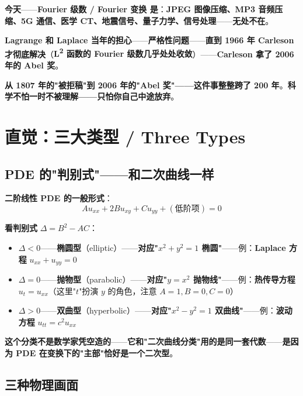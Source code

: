 \begin{tcolorbox}[storybox={\Large 小故事：Fourier 与三次被拒的论文}]
\medskip

\textbf{今天}——\textbf{Fourier 级数 / Fourier 变换 是}：\textbf{JPEG 图像压缩、MP3 音频压缩、5G 通信、医学 CT、地震信号、量子力学、信号处理}——\textbf{无处不在}。

\medskip

\textbf{Lagrange 和 Laplace 当年的担心}——\textbf{严格性问题}——\textbf{直到 1966 年 Carleson 才彻底解决}（\textbf{L\textsuperscript{2} 函数的 Fourier 级数几乎处处收敛}）——\textbf{Carleson 拿了 2006 年的 Abel 奖}。

\medskip

\textbf{从 1807 年的"被拒稿"到 2006 年的"Abel 奖"——这件事整整跨了 200 年}。\textbf{科学不怕一时不被理解——只怕你自己中途放弃}。
\end{tcolorbox}

\section{直觉：三大类型 / Three Types}

\subsection{PDE 的"判别式"——和二次曲线一样}

\textbf{二阶线性 PDE 的一般形式}：
\begin{equation}
A u_{xx} + 2B u_{xy} + C u_{yy} + (\text{低阶项}) = 0
\end{equation}

\textbf{看判别式} $\Delta = B^2 - AC$：

\begin{itemize}
\item $\Delta < 0$——\textbf{椭圆型}（elliptic）——\textbf{对应"$x^2 + y^2 = 1$ 椭圆"}——例：\textbf{Laplace 方程} $u_{xx} + u_{yy} = 0$
\item $\Delta = 0$——\textbf{抛物型}（parabolic）——\textbf{对应"$y = x^2$ 抛物线"}——例：\textbf{热传导方程} $u_t = u_{xx}$（这里"$t$"扮演 $y$ 的角色，注意 $A=1, B=0, C=0$）
\item $\Delta > 0$——\textbf{双曲型}（hyperbolic）——\textbf{对应"$x^2 - y^2 = 1$ 双曲线"}——例：\textbf{波动方程} $u_{tt} = c^2 u_{xx}$
\end{itemize}

\textbf{这个分类不是数学家凭空造的}——\textbf{它和"二次曲线分类"用的是同一套代数}——\textbf{是因为 PDE 在变换下的"主部"恰好是一个二次型}。

\subsection{三种物理画面}

